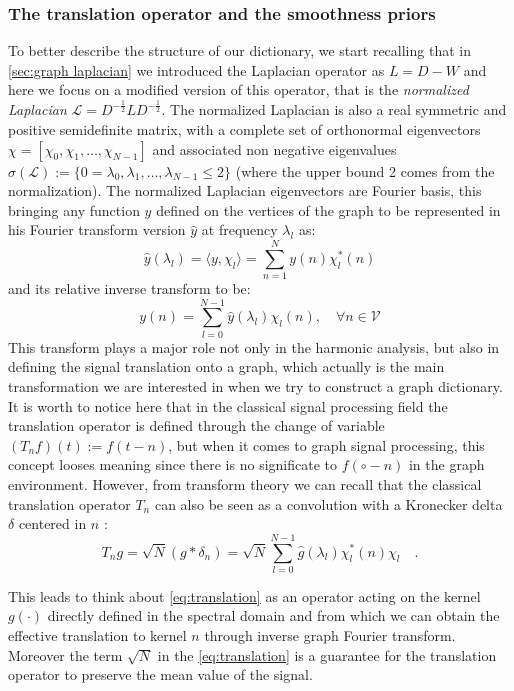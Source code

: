 \subsubsection{The translation operator and the smoothness priors}
To better describe the structure of our dictionary, we start recalling that in \autoref{sec:graph laplacian} we introduced the Laplacian operator as $L = D - W$ and here we focus on a modified version of this operator, that is the \textit{normalized Laplacian} $\mathcal{L} = D^{-\frac{1}{2}}LD^{-\frac{1}{2}}$. The normalized Laplacian is also a real symmetric and positive semidefinite matrix, with a complete set of orthonormal eigenvectors $\textbf{$\chi$} = [\chi_0,\chi_1,\dots,\chi_{N-1}]$ and associated non negative eigenvalues $\sigma(\mathcal{L}) := \{ 0 = \lambda_0,\lambda_1,\dots,\lambda_{N-1} \leq 2 \}$ (where the upper bound 2 comes from the normalization).
The normalized Laplacian eigenvectors are Fourier basis, this bringing any function $y$ defined on the vertices of the graph to be represented in his Fourier transform version $\hat{y}$ at frequency $\lambda_l$ as:
\begin{equation}
\hat{y}(\lambda_l) = \langle y, \chi_l \rangle = \sum_{n=1}^{N} y(n)\chi_l^{*}(n)
\end{equation}
and its relative inverse transform to be:
\begin{equation}
y(n) = \sum_{l=0}^{N-1} \hat{y}(\lambda_l)\chi_l(n), \quad \forall n \in \mathcal{V}
\end{equation}
This transform plays a major role not only in the harmonic analysis, but also in defining the signal translation onto a graph, which actually is the main transformation we are interested in when we try to construct a graph dictionary. It is worth to notice here that in the classical signal processing field the translation operator is defined through the change of variable $(T_n f)(t) := f(t-n)$, but when it comes to graph signal processing, this concept looses meaning since there is no significate to $f(\circ - n)$ in the graph environment. However, from transform theory we can recall that the classical translation operator $T_n$ can also be seen as a convolution with a Kronecker delta $\delta$ centered in $n$\cite{Shuman2013} \cite{Thanou2014}:
\begin{equation}
T_n g = \sqrt{N}(g * \delta_n) = \sqrt{N}\sum_{l=0}^{N-1}\hat{g}(\lambda_l)\chi_l^{*}(n)\chi_l \quad .
\label{eq:translation}
\end{equation}

This leads to think about \autoref{eq:translation} as an operator acting on the kernel $g(\cdot)$ directly defined in the spectral domain and from which we can obtain the effective translation to kernel $n$ through inverse graph Fourier transform. Moreover the term $\sqrt{N}$ in the \autoref{eq:translation} is a guarantee for the translation operator to preserve the mean value of the signal.\\

